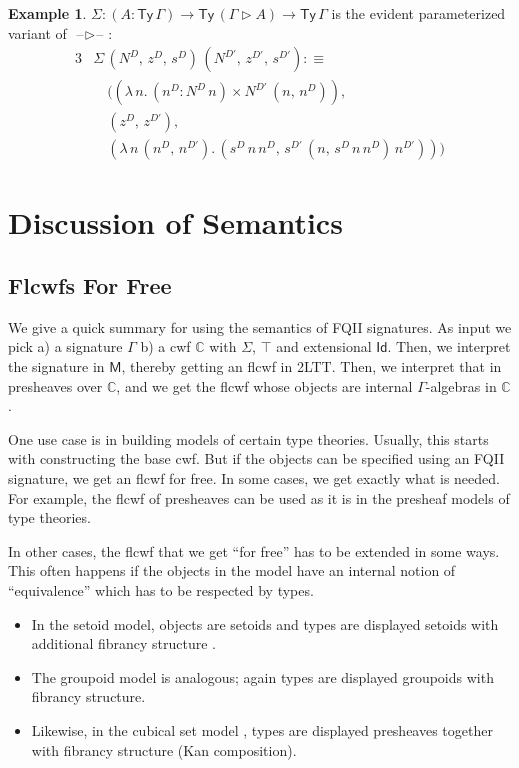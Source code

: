 \documentclass[12pt,a4paper,twoside,openany]{book}
\theoremstyle{remark}
\theoremstyle{definition}
\newtheorem{myexample}{Example}
\theoremstyle{theorem}
\newcommand{\mbb}[1]{\mathbb{#1}}
\newcommand{\bs}[1]{\boldsymbol{#1}}
\newcommand{\Ty}{\mathsf{Ty}}
\newcommand{\Id}{\mathsf{Id}}
\newcommand{\blank}{\mathord{\hspace{1pt}\text{--}\hspace{1pt}}}
\newcommand{\ext}{\triangleright}
\newcommand{\bM}{\bs{\mathsf{M}}}
\newcommand{\mbbC}{\mbb{C}}
\newcommand{\defn}{:\equiv}
\begin{document}
\begin{myexample}
$\Sigma : (A : \Ty\,\Gamma) \to \Ty\,(\Gamma \ext A) \to \Ty\,\Gamma$ is the
evident parameterized variant of $\blank\ext\blank$:
\begin{alignat*}{3}
  &\Sigma\,(N^D,\,z^D,\,s^D)\,(N^{D'},\,z^{D'},\,s^{D'}) \defn\\
  & \hspace{1em}((\lambda\,n.\,(n^D : N^D\,n) \times N^{D'}\,(n,\,n^D)),\,\\
  & \hspace{1em}(z^D,\,z^{D'}),\,\\
  & \hspace{1em}(\lambda\,n\,(n^D,\,n^{D'}).\,(s^D\,n\,n^D,\,s^{D'}\,(n,\,s^D\,n\,n^D)\,n^{D'})))
\end{alignat*}
\end{myexample}


\section{Discussion of Semantics}

\subsection{Flcwfs For Free}

We give a quick summary for using the semantics of FQII signatures. As input we
pick a) a signature $\Gamma$ b) a cwf $\mbbC$ with $\Sigma$, $\top$ and
extensional $\Id$. Then, we interpret the signature in $\bM$, thereby getting an
flcwf in 2LTT. Then, we interpret that in presheaves over $\mbbC$, and we get
the flcwf whose objects are internal $\Gamma$-algebras in $\mbbC$.

One use case is in building models of certain type theories. Usually, this
starts with constructing the base cwf. But if the objects can be specified using
an FQII signature, we get an flcwf for free. In some cases, we get exactly
what is needed. For example, the flcwf of presheaves can be used as it is in the
presheaf models of type theories.

In other cases, the flcwf that we get ``for free'' has to be extended in some
ways. This often happens if the objects in the model have an internal notion of
``equivalence'' which has to be respected by types.
\begin{itemize}
  \item In the setoid model, objects are setoids and types are displayed
    setoids with additional fibrancy structure \cite{setoidtt}.
  \item The groupoid model \cite{hofmann96groupoidmodel} is analogous; again types are displayed groupoids
    with fibrancy structure.
  \item Likewise, in the cubical set model \cite{cubical}, types are displayed
    presheaves together with fibrancy structure (Kan composition).
\end{itemize}
\end{document}
